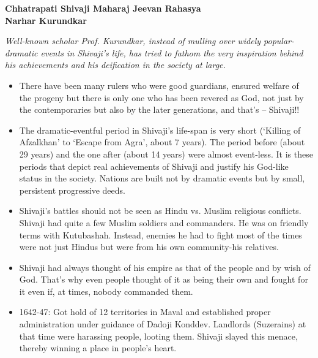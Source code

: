 \begin{center}
     \Large{\textbf{Chhatrapati Shivaji Maharaj Jeevan Rahasya \\ Narhar Kurundkar }}  %
\end{center}

{\em Well-known scholar Prof. Kurundkar, instead of mulling over widely popular-dramatic events in Shivaji’s life, has tried to fathom the very inspiration behind his achievements and his deification in the society at large.}

\bigskip

\begin{itemize}[noitemsep,nolistsep]

\item There have been many rulers who were good guardians,  ensured welfare of the progeny but there is only one who has been revered as God,  not just by the contemporaries but also by the later generations, and that’s – Shivaji!!

\item The dramatic-eventful period in Shivaji’s life-span is very short (‘Killing of Afzalkhan’ to ‘Escape from Agra’, about 7 years). The period before (about 29 years) and the one after (about 14 years) were almost event-less. It is these periods that depict real achievements of Shivaji and justify his God-like status in the society. Nations are built not by dramatic events but by small, persistent progressive deeds.

\item Shivaji’s battles should not be seen as Hindu vs. Muslim religious conflicts. Shivaji had quite a few Muslim soldiers and commanders. He was on friendly terms with Kutubashah. Instead, enemies he had to fight most of the times were not just Hindus but were from his own community-his relatives. 

\item Shivaji had always thought of his empire as that of the people and by wish of God. That’s why even people thought of it as being their own and fought for it even if, at times, nobody commanded them.

\item 1642-47: Got hold of 12 territories in Maval and established proper administration under guidance of Dadoji Konddev. Landlords (Suzerains) at that time were harassing people, looting them. Shivaji slayed this menace, thereby winning a place in people’s heart.


\end{itemize}

